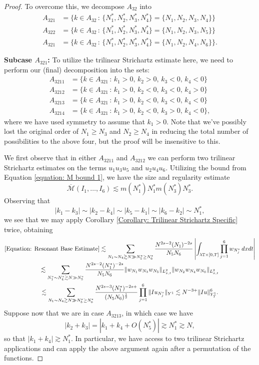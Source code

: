\documentclass[10pt,a4paper]{amsart}
\begin{document}
\begin{proof}
    To overcome this, we decompose $A_{32}$ into
    \begin{align*}
        A_{321} &= \{k\in A_{32}\,:\,\{N_1^*,N_2^*,N_3^*,N_4^*\} = \{N_1,N_2,N_3,N_4\}\}\\
        A_{322} &= \{k\in A_{32}\,:\,\{N_1^*,N_2^*,N_3^*,N_4^*\} = \{N_1,N_2,N_3,N_5\}\}\\
        A_{321} &= \{k\in A_{32}\,:\,\{N_1^*,N_2^*,N_3^*,N_4^*\} = \{N_1,N_2,N_4,N_6\}\}.
    \end{align*}

    \textbf{Subcase $A_{321}$: } To utilize the trilinear Strichartz estimate here, we need to perform our (final) decomposition into the sets:
    \begin{align*}
        A_{3211} &= \{k\in A_{321}\,:\,k_1 >0,\, k_2 > 0,\, k_3 < 0,\, k_4 < 0\}\\
        A_{3212} &= \{k\in A_{321}\,:\,k_1 >0,\, k_2 < 0,\, k_3 < 0,\, k_4 > 0\}\\
        A_{3213} &= \{k\in A_{321}\,:\,k_1 >0,\, k_2 < 0,\, k_3 < 0,\, k_4 < 0\}\\
        A_{3214} &= \{k\in A_{321}\,:\,k_1 >0,\, k_2 < 0,\, k_3 > 0,\, k_4 < 0\},
    \end{align*}
    where we have used symmetry to assume that $k_1 > 0$. Note that we've possibly lost the original order of $N_1\geq N_3$ and $N_2\geq N_4$ in reducing the total number of possibilities to the above four, but the proof will be insensitive to this.

    We first observe that in either $A_{3211}$ and $A_{3212}$ we can perform two trilinear Strichartz estimates on the terms $u_1u_3u_5$ and $u_2u_4u_6$. Utilizing the bound from Equation \eqref{equation: M bound 1}, we have the size and regularity estimate
    \[
    \overline{\mathcal{M}}(I_1,\dots, I_6)\lesssim m(N_1^*)N_1^*m(N_3^*)N_3^*.
    \]
    Observing that
    \[
    |k_1-k_3|\sim |k_2-k_4|\sim |k_5-k_1|\sim |k_6-k_2|\sim N_1^*,
    \]
    we see that we may apply Corollary \ref{Corollary: Trilinear Strichartz Specific} twice, obtaining
    \begin{multline*}
        \eqref{Equation: Resonant Base Estimate}\lesssim \sum_{N_1\sim N_4\gtrsim N\gg N_5^*\geq N_6^*}\frac{N^{2s-2}(N_1)^{-2s}}{N_5N_6}\left|\int_{\lambda\mathbb{T}\times [0,T]}\prod_{j=1}^6w_{N_j^*}\,dxdt\right|\\
        \lesssim \sum_{N_1^*\sim N_4^*\gtrsim N\gg N_5^*}\frac{N^{2s-2}(N_1^*)^{-2s}}{N_5N_6}\|w_{N_1}w_{N_3}w_{N_5}\|_{L^2_{x,t}}\|w_{N_2}w_{N_4}w_{N_6}\|_{L^2_{x,t}}\\
        \lesssim \sum_{N_1\sim N_4\gtrsim N\gg N_5^*\geq N_6^*}\frac{N^{2s-3}(N_1^*)^{-2s+}}{(N_5N_6)^{\frac12}}\prod_{j=1}^6\|Iu_{N_j^*}\|_{Y^1}\lesssim N^{-3+}\|Iu\|_{Y^1_T}^6.
    \end{multline*}
    Suppose now that we are in case $A_{3213}$, in which case we have
    \[
    |k_2+k_3| = |k_1+k_4 + O(N_5^*)|\gtrsim N_1^*\gtrsim N,
    \]
    so that $|k_1+k_4|\gtrsim N_1^*$. In particular, we have access to two trilinear Strichartz applications and can apply the above argument again after a permutation of the functions.


\end{proof}
\end{document}
